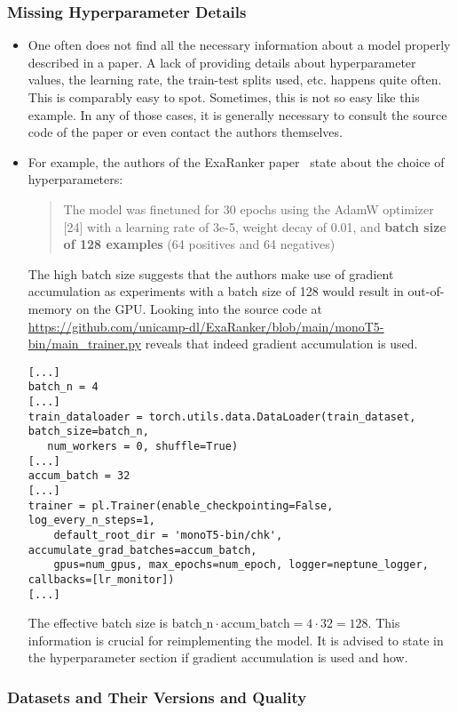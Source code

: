 \documentclass[manuscript, nonacm]{acmart}
\begin{document}
\subsubsection{Missing Hyperparameter Details}

\begin{itemize}
\item One often does not find all the necessary information about a model properly described in a paper.
%
A lack of providing details about hyperparameter values, \eg the learning rate, the train-test splits used, etc. happens quite often. 
This is comparably easy to spot.
Sometimes, this is not so easy like this example.
In any of those cases, it is generally necessary to consult the source code of the paper or even contact the authors themselves.

\item For example, the authors of the ExaRanker paper~\cite{DBLP:conf/sigir/FerrarettoLLN23} state about the choice of hyperparameters: 
\begin{quote}
The model was finetuned for 30 epochs using the AdamW optimizer [24] with a learning rate of 3e-5, weight decay of 0.01, and \textbf{batch size of 128 examples} (64 positives and 64 negatives)
\end{quote}

The high batch size suggests that the authors make use of gradient accumulation as experiments with a batch size of 128 would result in out-of-memory on the GPU.
%
Looking into the source code at \url{https://github.com/unicamp-dl/ExaRanker/blob/main/monoT5-bin/main_trainer.py} 
reveals that indeed gradient accumulation is used.
\begin{verbatim}
[...]
batch_n = 4
[...]
train_dataloader = torch.utils.data.DataLoader(train_dataset, batch_size=batch_n, 
   num_workers = 0, shuffle=True)
[...]
accum_batch = 32
[...]
trainer = pl.Trainer(enable_checkpointing=False, log_every_n_steps=1, 
    default_root_dir = 'monoT5-bin/chk', accumulate_grad_batches=accum_batch, 
    gpus=num_gpus, max_epochs=num_epoch, logger=neptune_logger, callbacks=[lr_monitor])
[...]
\end{verbatim}
The effective batch size is $\text{batch\_n} \cdot \text{accum\_batch} = 4 \cdot 32 = 128$.
%
This information is crucial for reimplementing the model.
It is advised to state in the hyperparameter section if gradient accumulation is used and how.
\end{itemize}

\subsubsection{Datasets and Their Versions and Quality}
\end{document}
